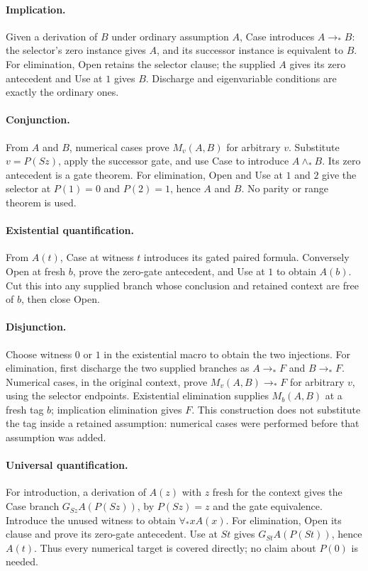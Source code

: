 \paragraph{Implication.}
Given a derivation of $B$ under ordinary assumption $A$, Case introduces
$A\to_*B$: the selector's zero instance gives $A$, and its successor
instance is equivalent to $B$. For elimination, Open retains the selector
clause; the supplied $A$ gives its zero antecedent and Use at $1$ gives
$B$. Discharge and eigenvariable conditions are exactly the ordinary ones.

\paragraph{Conjunction.}
From $A$ and $B$, numerical cases prove $M_v(A,B)$ for arbitrary $v$.
Substitute $v=P(Sz)$, apply the successor gate, and use Case to introduce
$A\land_*B$. Its zero antecedent is a gate theorem. For elimination,
Open and Use at $1$ and $2$ give the selector at $P(1)=0$ and
$P(2)=1$, hence $A$ and $B$. No parity or range theorem is used.

\paragraph{Existential quantification.}
From $A(t)$, Case at witness $t$ introduces its gated paired formula.
Conversely Open at fresh $b$, prove the zero-gate antecedent, and Use at
$1$ to obtain $A(b)$. Cut this into any supplied branch whose conclusion
and retained context are free of $b$, then close Open.

\paragraph{Disjunction.}
Choose witness $0$ or $1$ in the existential macro to obtain the two
injections. For elimination, first discharge the two supplied branches
as $A\to_*F$ and $B\to_*F$. Numerical cases, in the original context,
prove $M_v(A,B)\to_*F$ for arbitrary $v$, using the selector endpoints.
Existential elimination supplies $M_b(A,B)$ at a fresh tag $b$;
implication elimination gives $F$. This construction does not substitute
the tag inside a retained assumption: numerical cases were performed
before that assumption was added.

\paragraph{Universal quantification.}
For introduction, a derivation of $A(z)$ with $z$ fresh for the context
gives the Case branch $G_{Sz}A(P(Sz))$, by $P(Sz)=z$ and the gate
equivalence. Introduce the unused witness to obtain $\forall_*xA(x)$.
For elimination, Open its clause and prove its zero-gate antecedent.
Use at $St$ gives $G_{St}A(P(St))$, hence $A(t)$. Thus every numerical
target is covered directly; no claim about $P(0)$ is needed.

